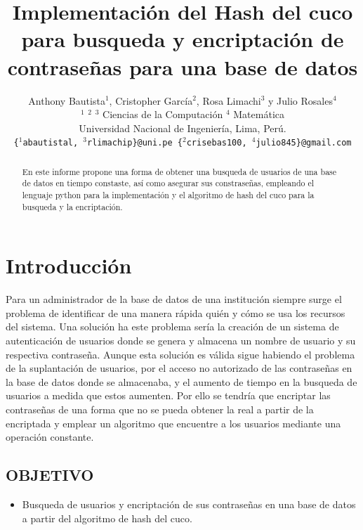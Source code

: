 \documentclass[final,a4paper,twocolumn,romanappendices]{IEEEtran}
\title{Implementación del Hash del cuco para busqueda y encriptación de contraseñas para una base de datos }
\author{Anthony Bautista$^{1}$, Cristopher García$^{2}$, Rosa Limachi$^{3}$ y Julio Rosales$^{4}$\\
\small{$^{1}$ $^{2}$ $^{3}$ Ciencias de la Computación $^{4}$ Matemática\\}
\small{Universidad Nacional de Ingeniería, Lima, Perú.\\}
\small{\texttt{\{$^{1}$abautistal, $^{3}$rlimachip\}@uni.pe \{$^{2}$crisebas100, $^{4}$julio845\}@gmail.com}}
}
\begin{document}
\maketitle

\begin{abstract}
En este informe propone una forma de obtener una busqueda de usuarios de una base de datos en tiempo constaste, as\'i como asegurar sus constrase\~nas, empleando el lenguaje python para la implementación y el algoritmo de hash del cuco para la busqueda y la encriptación. 

\end{abstract}

\section{Introducción}

Para un administrador  de la base de datos de una institución siempre surge el problema de identificar de una manera r\'apida quién y cómo se usa los recursos del sistema. Una solución ha este problema sería la creación de un sistema de autenticación de usuarios donde se genera y almacena un nombre de usuario y su respectiva contraseña. Aunque esta solución es válida sigue habiendo el problema de la suplantación de usuarios, por el acceso no autorizado de las contraseñas en la base de datos donde se almacenaba, y el aumento de tiempo en la busqueda de usuarios a medida que estos aumenten. Por ello se tendría que encriptar las contraseñas de una forma que no se pueda obtener la real a partir de la encriptada y emplear un algoritmo que encuentre a los usuarios mediante una operaci\'on constante.

\subsection{OBJETIVO}
\begin{itemize}
    \item Busqueda de usuarios y encriptación de sus contraseñas en una base de datos a partir del algoritmo de hash del cuco.
\end{itemize}
%
\end{document}
